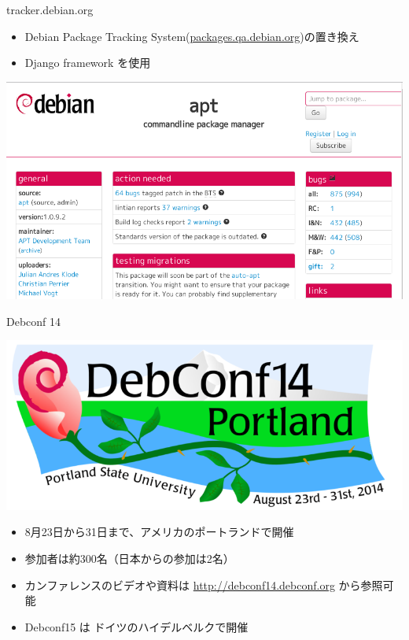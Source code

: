 \begin{frame}{tracker.debian.org}
\begin{itemize}
\item Debian Package Tracking System(\url{packages.qa.debian.org})の置き換え
\item Django framework を使用
\end{itemize}

\begin{center}
\includegraphics[scale=0.3]{image201410/tracker.png}
\end{center}

\end{frame}


\begin{frame}{Debconf 14}

\begin{center}
\includegraphics[scale=0.25]{image201410/debconf14-logo.png}
\end{center}

\begin{itemize}
\item 8月23日から31日まで、アメリカのポートランドで開催
\item 参加者は約300名（日本からの参加は2名）
\item カンファレンスのビデオや資料は \url{http://debconf14.debconf.org}
から参照可能
\item Debconf15 は ドイツのハイデルベルクで開催
\end{itemize}
\end{frame}

